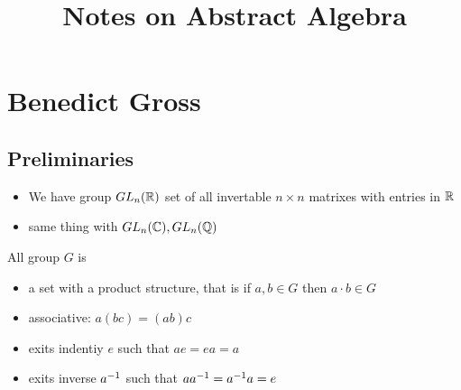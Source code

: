 



\title{Notes on Abstract Algebra}


\maketitle
\chapter{Benedict Gross}

\section{Preliminaries}
\begin{itemize}
  \item We have group
    $GL_n(\mathbb{R})$ set of all invertable $n\times n$ matrixes with
    entries in $\mathbb{R}$
  \item same thing with $GL_n(\mathbb{C}), GL_n(\mathbb{Q})$
\end{itemize}
\begin{definition}[Group]
  All group $G$ is 
  \begin{itemize}
    \item  a set with a product structure, that is if 
      $a,b\in G$ then $a\cdot b\in G$
    \item associative: $a(bc)=(ab)c$
    \item exits indentiy $e$ such that $ae=ea=a$
    \item exits inverse $a^{-1}$  such that
      $aa^{-1}=a^{-1} a=e$
  \end{itemize}
\end{definition}

